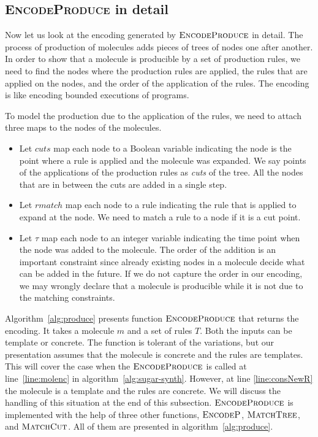 \subsection{\textsc{EncodeProduce} in detail}


Now let us look at the encoding generated by $\textsc{EncodeProduce}$
in detail.
The process of production of molecules adds pieces of trees of nodes
one after another.
In order to show that a molecule is producible by a set of production rules,
we need to find the nodes where the production rules are applied,
the rules that are applied on the nodes, and
the order of the application of the rules.
The encoding is like encoding bounded executions of programs.

To model the production due to the application of the rules,
we need to attach three maps to the nodes of the molecules.
\begin{itemize}
\item Let $cuts$ map each node to a Boolean variable
indicating the node is the point where a rule is applied and the
molecule was expanded.
We say points of the applications of the production
rules as {\em cuts} of the tree.
All the nodes that are in between the cuts are added in a single step.

\item Let $rmatch$ map each node to a rule indicating
  the rule that is applied to expand at the node.
  We need to match a rule to a node if it is a cut point.
\item Let $\tau$ map each node to an integer variable
  indicating the time point when the node was added to the molecule.
  The order of the addition is an important constraint since already
  existing nodes in a molecule decide what can be added in the future.
  If we do not capture the order in our encoding, we may wrongly declare
  that a molecule is producible while it is not due to the matching
  constraints.
\end{itemize}

Algorithm~\ref{alg:produce} presents function $\textsc{EncodeProduce}$
that returns the encoding.
It takes a molecule $m$ and a set of rules $T$.
Both the inputs can be template or concrete.
The function is tolerant of the variations, but our presentation
assumes that the molecule is concrete and the rules are templates.
This will cover the case when the $\textsc{EncodeProduce}$ is called at
line~\ref{line:molenc} in algorithm~\ref{alg:sugar-synth}.
However, at line \ref{line:consNewR} the molecule is a template
and the rules are concrete.
We will discuss the handling of this situation at the end of this subsection.
$\textsc{EncodeProduce}$ is implemented with the help of three other functions,
$\textsc{EncodeP}$, $\textsc{MatchTree}$, and $\textsc{MatchCut}$.
All of them are presented in algorithm~\ref{alg:produce}.
%

